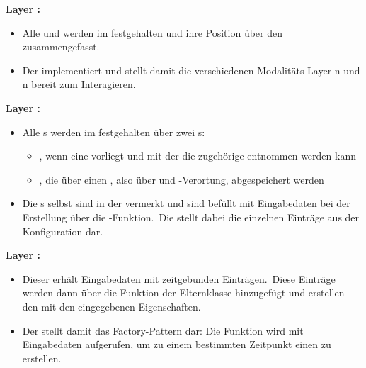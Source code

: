 \textbf{Layer :}
\begin{itemize}
    \item Alle  und  werden im  festgehalten und ihre Position über den  zusammengefasst.
    \item Der  implementiert  und stellt damit die verschiedenen Modalitäts-Layer n und n bereit zum Interagieren.
\end{itemize}

\textbf{Layer :}
\begin{itemize}
    \item Alle s werden im  festgehalten über zwei s:
    \begin{itemize}
        \item {}, wenn eine  vorliegt und mit der die zugehörige  entnommen werden kann
        \item {}, die über einen , also über  und -Verortung, abgespeichert werden
    \end{itemize}
    \item Die s selbst sind in der  vermerkt und sind befüllt mit Eingabedaten bei der Erstellung über die -Funktion.~Die  stellt dabei die einzelnen Einträge aus der Konfiguration dar.
\end{itemize}

\textbf{Layer :}
\begin{itemize}
    \item Dieser  erhält Eingabedaten mit zeitgebunden Einträgen.~Diese Einträge werden dann über die Funktion  der Elternklasse  hinzugefügt und erstellen den  mit den eingegebenen Eigenschaften.
    \item Der  stellt damit das Factory-Pattern dar: Die Funktion  wird mit Eingabedaten aufgerufen, um zu einem bestimmten Zeitpunkt einen  zu erstellen.
\end{itemize}


